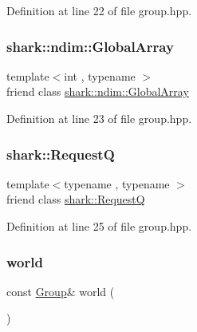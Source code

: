 Definition at line 22 of file group.\+hpp.

\hypertarget{classshark_1_1_group_a8a5e7aad8bd5339747078692740c0a59}{}\label{classshark_1_1_group_a8a5e7aad8bd5339747078692740c0a59} 
\subsubsection{\texorpdfstring{shark\+::ndim\+::\+Global\+Array}{shark::ndim::GlobalArray}}
{\footnotesize\ttfamily template$<$int , typename $>$ \\
friend class \hyperlink{classshark_1_1ndim_1_1_global_array}{shark\+::ndim\+::\+Global\+Array}\hspace{0.3cm}{\ttfamily [friend]}}



Definition at line 23 of file group.\+hpp.

\hypertarget{classshark_1_1_group_af2ebd450d7dfe66c0e03093941a9f357}{}\label{classshark_1_1_group_af2ebd450d7dfe66c0e03093941a9f357} 
\subsubsection{\texorpdfstring{shark\+::\+RequestQ}{shark::RequestQ}}
{\footnotesize\ttfamily template$<$typename , typename $>$ \\
friend class \hyperlink{classshark_1_1_request_q}{shark\+::\+RequestQ}\hspace{0.3cm}{\ttfamily [friend]}}



Definition at line 25 of file group.\+hpp.

\hypertarget{classshark_1_1_group_ab2389cee4068fd386c970669a3beb2c0}{}\label{classshark_1_1_group_ab2389cee4068fd386c970669a3beb2c0} 
\subsubsection{\texorpdfstring{world}{world}}
{\footnotesize\ttfamily const \hyperlink{classshark_1_1_group}{Group}\& world (\begin{DoxyParamCaption}{ }\end{DoxyParamCaption})\hspace{0.3cm}{\ttfamily [friend]}}

